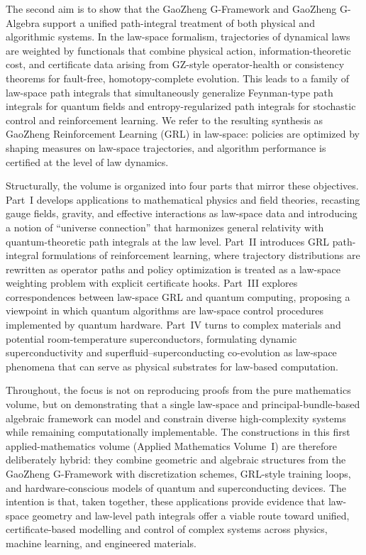 \documentclass[11pt]{book}
\theoremstyle{plain}
\theoremstyle{definition}
\theoremstyle{remark}
\begin{document}
The second aim is to show that the GaoZheng G-Framework and GaoZheng
G-Algebra support a unified path-integral treatment of both physical
and algorithmic systems. In the law-space formalism, trajectories of
dynamical laws are weighted by functionals that combine physical
action, information-theoretic cost, and certificate data arising
from GZ-style operator-health or consistency theorems for
fault-free, homotopy-complete evolution. This leads to a family of
law-space path integrals that simultaneously generalize
Feynman-type path integrals for quantum fields and
entropy-regularized path integrals for stochastic control and
reinforcement learning. We refer to the resulting synthesis as
GaoZheng Reinforcement Learning (GRL) in law-space: policies are
optimized by shaping measures on law-space trajectories, and
algorithm performance is certified at the level of law dynamics.

Structurally, the volume is organized into four parts that mirror
these objectives. Part~I develops applications to mathematical
physics and field theories, recasting gauge fields, gravity, and
effective interactions as law-space data and introducing a notion of
``universe connection'' that harmonizes general relativity with
quantum-theoretic path integrals at the law level. Part~II introduces
GRL path-integral formulations of reinforcement learning, where
trajectory distributions are rewritten as operator paths and policy
optimization is treated as a law-space weighting problem with
explicit certificate hooks. Part~III explores correspondences between
law-space GRL and quantum computing, proposing a viewpoint in which
quantum algorithms are law-space control procedures implemented by
quantum hardware. Part~IV turns to complex materials and potential
room-temperature superconductors, formulating dynamic superconductivity
and superfluid--superconducting co-evolution as law-space phenomena
that can serve as physical substrates for law-based computation.

Throughout, the focus is not on reproducing proofs from the pure
mathematics volume, but on demonstrating that a single law-space and
principal-bundle-based algebraic framework can model and constrain
diverse high-complexity systems while remaining computationally
implementable. The constructions in this first applied-mathematics
volume (Applied Mathematics Volume~I) are
therefore deliberately hybrid: they combine geometric and algebraic
structures from the GaoZheng G-Framework with discretization schemes,
GRL-style training loops, and hardware-conscious models of quantum
and superconducting devices. The intention is that, taken together,
these applications provide evidence that law-space geometry and
law-level path integrals offer a viable route toward unified,
certificate-based modelling and control of complex systems across
physics, machine learning, and engineered materials.
\end{document}

